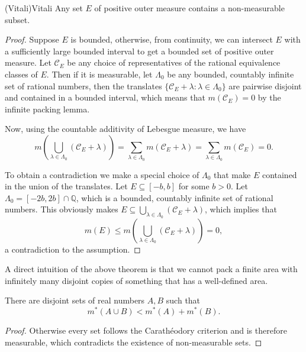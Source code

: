 \documentclass[../main.tex]{subfiles}
\begin{document}
\begin{theorem}{(Vitali)}{Vitali}
  Any set $E$ of positive outer measure contains a non-measurable subset.
\end{theorem}
\begin{proof}
  Suppose $E$ is bounded, otherwise, from continuity, we can intersect $E$ with a sufficiently large bounded interval to get a bounded set of positive outer measure. Let $\mathcal{C}_E$ be any choice of representatives of the rational equivalence classes of $E$. Then if it is measurable, let $\Lambda_0$ be any bounded, countably infinite set of rational numbers, then the translates $\{\mathcal{C}_E + \lambda : \lambda \in \Lambda_0\}$ are pairwise disjoint and contained in a bounded interval, which means that $m(\mathcal{C}_E) = 0$ by the infinite packing lemma.

  Now, using the countable additivity of Lebesgue measure, we have
  \begin{equation*}
    m\left(\bigcup_{\lambda \in \Lambda_0} (\mathcal{C}_E + \lambda)\right) = \sum_{\lambda \in \Lambda_0} m(\mathcal{C}_E + \lambda) = \sum_{\lambda \in \Lambda_0} m(\mathcal{C}_E) = 0.
  \end{equation*}

  To obtain a contradiction we make a special choice of $\Lambda_0$ that make $E$ contained in the union of the translates. Let $E \subseteq [-b, b]$ for some $b > 0$. Let $\Lambda_0 = [-2b, 2b] \cap \mathbb{Q}$, which is a bounded, countably infinite set of rational numbers. This obviously makes $E \subseteq \bigcup_{\lambda \in \Lambda_0} (\mathcal{C}_E + \lambda)$, which implies that
  \begin{equation*}
    m(E) \leq m\left(\bigcup_{\lambda \in \Lambda_0} (\mathcal{C}_E + \lambda)\right) = 0,
  \end{equation*}
  a contradiction to the assumption.
\end{proof}

\begin{remark}
  A direct intuition of the above theorem is that we cannot pack a finite area with infinitely many disjoint copies of something that has a well-defined area.
\end{remark}

\begin{proposition}{}{}
  There are disjoint sets of real numbers $A,B$ such that
  \begin{equation}
    m^*(A \cup B) < m^*(A) + m^*(B).
  \end{equation}
\end{proposition}
\begin{proof}
  Otherwise every set follows the Carathéodory criterion and is therefore measurable, which contradicts the existence of non-measurable sets.
\end{proof}
\end{document}
